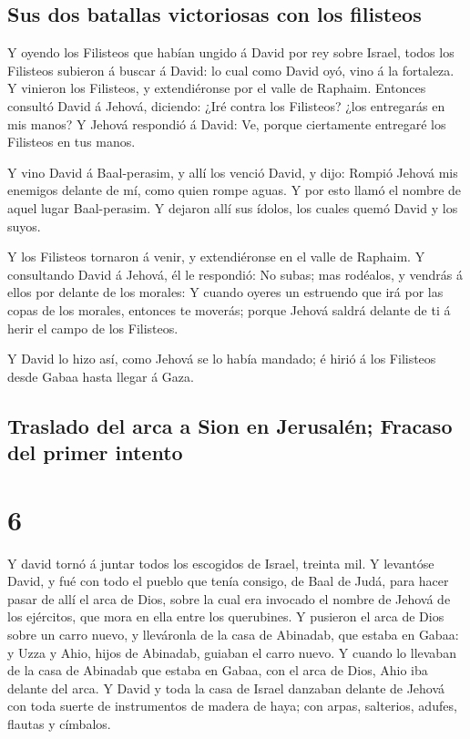 \hypertarget{sus-dos-batallas-victoriosas-con-los-filisteos}{%
\subsection{Sus dos batallas victoriosas con los
filisteos}\label{sus-dos-batallas-victoriosas-con-los-filisteos}}

 Y oyendo los Filisteos que habían ungido á David por rey
sobre Israel, todos los Filisteos subieron á buscar á David: lo cual
como David oyó, vino á la fortaleza.  Y vinieron los
Filisteos, y extendiéronse por el valle de Raphaim. 
Entonces consultó David á Jehová, diciendo: ¿Iré contra los Filisteos?
¿los entregarás en mis manos? Y Jehová respondió á David: Ve, porque
ciertamente entregaré los Filisteos en tus manos.

 Y vino David á Baal-perasim, y allí los venció David, y
dijo: Rompió Jehová mis enemigos delante de mí, como quien rompe aguas.
Y por esto llamó el nombre de aquel lugar Baal-perasim.  Y
dejaron allí sus ídolos, los cuales quemó David y los suyos.

 Y los Filisteos tornaron á venir, y extendiéronse en el
valle de Raphaim.  Y consultando David á Jehová, él le
respondió: No subas; mas rodéalos, y vendrás á ellos por delante de los
morales:  Y cuando oyeres un estruendo que irá por las
copas de los morales, entonces te moverás; porque Jehová saldrá delante
de ti á herir el campo de los Filisteos.

 Y David lo hizo así, como Jehová se lo había mandado; é
hirió á los Filisteos desde Gabaa hasta llegar á Gaza.

\hypertarget{traslado-del-arca-a-sion-en-jerusaluxe9n-fracaso-del-primer-intento}{%
\subsection{Traslado del arca a Sion en Jerusalén; Fracaso del primer
intento}\label{traslado-del-arca-a-sion-en-jerusaluxe9n-fracaso-del-primer-intento}}

\hypertarget{section-5}{%
\section{6}\label{section-5}}

 Y david tornó á juntar todos los escogidos de Israel,
treinta mil.  Y levantóse David, y fué con todo el pueblo
que tenía consigo, de Baal de Judá, para hacer pasar de allí el arca de
Dios, sobre la cual era invocado el nombre de Jehová de los ejércitos,
que mora en ella entre los querubines.  Y pusieron el arca
de Dios sobre un carro nuevo, y lleváronla de la casa de Abinadab, que
estaba en Gabaa: y Uzza y Ahio, hijos de Abinadab, guiaban el carro
nuevo.  Y cuando lo llevaban de la casa de Abinadab que
estaba en Gabaa, con el arca de Dios, Ahio iba delante del arca.
 Y David y toda la casa de Israel danzaban delante de Jehová
con toda suerte de instrumentos de madera de haya; con arpas, salterios,
adufes, flautas y címbalos.


